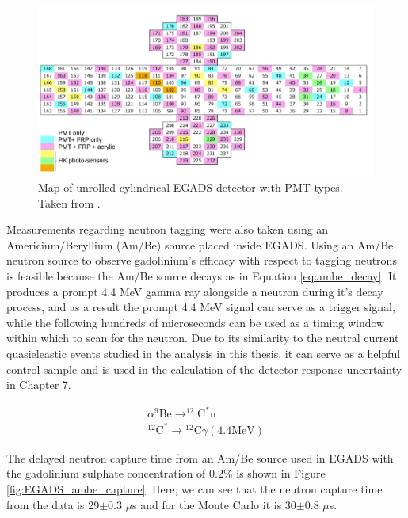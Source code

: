 \begin{figure}[H]
    \includegraphics[width=\textwidth]{Figures/egads_pmt_map.png}
\caption{Map of unrolled cylindrical EGADS detector with PMT types. Taken from \cite{martiEvaluationGadoliniumAction2020a}.}
\label{fig:EGADS_PMT}
\end{figure}

Measurements regarding neutron tagging were also taken using an Americium/Beryllium (Am/Be) source placed inside EGADS. Using an Am/Be neutron source to observe gadolinium's efficacy with respect to tagging neutrons is feasible because the Am/Be source decays as in Equation \ref{eq:ambe_decay}. It produces a prompt 4.4 MeV gamma ray alongside a neutron during it's decay process, and as a result the prompt 4.4 MeV signal can serve as a trigger signal, while the following hundreds of microseconds can be used as a timing window within which to scan for the neutron. Due to its similarity to the neutral current quasieleastic events studied in the analysis in this thesis, it can serve as a helpful control sample and is used in the calculation of the detector response uncertainty in Chapter 7.

\begin{equation}
\begin{array}{c}
\alpha^{9} \mathrm{Be} \longrightarrow^{12} \mathrm{C}^{*} \mathrm{n} \\
{ }^{12} \mathrm{C}^{*} \longrightarrow{ }^{12} \mathrm{C} \gamma(4.4 \mathrm{MeV})
\end{array}
\label{eq:ambe_decay}
\end{equation}

The delayed neutron capture time from an Am/Be source used in EGADS with the gadolinium sulphate concentration of 0.2\% is shown in Figure \ref{fig:EGADS_ambe_capture}. Here, we can see that the neutron capture time from the data is 29$\pm$0.3 $\mu$s and for the Monte Carlo it is 30$\pm$0.8 $\mu$s.

